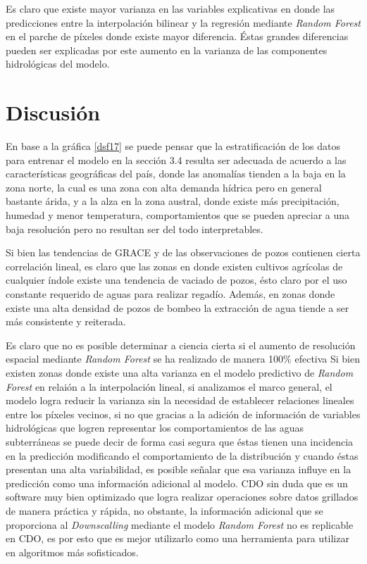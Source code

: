 Es claro que existe mayor varianza en las variables explicativas en donde las predicciones entre la interpolación bilinear y la regresión mediante \textit{Random Forest} en el parche de píxeles donde existe mayor diferencia. Éstas grandes diferencias
pueden ser explicadas por este aumento en la varianza de las componentes hidrológicas del modelo.
%
%

\section{Discusión}

En base a la gráfica \ref{dsf17} se puede pensar que la estratificación de los datos para entrenar el modelo en la sección 3.4 resulta ser adecuada de acuerdo a las características geográficas del país, donde las anomalías
tienden a la baja en la zona norte, la cual es una zona con alta demanda hídrica pero en general bastante árida, y a la alza en la zona austral, donde existe más precipitación, humedad y menor temperatura, comportamientos que se pueden apreciar a una baja resolución pero no resultan ser del todo interpretables.

Si bien las tendencias de GRACE y de las observaciones de pozos contienen cierta correlación lineal, es claro que las zonas en donde existen cultivos agrícolas de cualquier índole existe una tendencia de vaciado de pozos, ésto claro por el
uso constante requerido de aguas para realizar regadío. Además, en zonas donde existe una alta densidad de pozos de bombeo la extracción de agua tiende a ser más consistente y reiterada.

Es claro que no es posible determinar a ciencia cierta si el aumento de resolución espacial mediante \textit{Random Forest} se ha realizado de manera 100$\%$ efectiva
Si bien existen zonas donde existe una alta varianza en el modelo predictivo de \textit{Random Forest} en relaión a la interpolación lineal, si analizamos el marco general, el modelo logra reducir la varianza sin la necesidad de establecer relaciones lineales entre los píxeles vecinos, si no que gracias a
la adición de información de variables hidrológicas que logren representar los comportamientos de las aguas subterráneas se puede decir de forma casi segura que éstas tienen una incidencia en la predicción modificando el comportamiento de la distribución y cuando éstas presentan una alta variabilidad, es 
posible señalar que esa varianza influye en la predicción como una información adicional al modelo. CDO sin duda que es un software muy 
bien optimizado que logra realizar operaciones sobre datos grillados de manera práctica y rápida, no obstante, la información adicional que se proporciona 
al \textit{Downscalling} mediante el modelo \textit{Random Forest} no es replicable en CDO, es por esto que es mejor utilizarlo como una herramienta para utilizar en algoritmos más sofisticados. 

